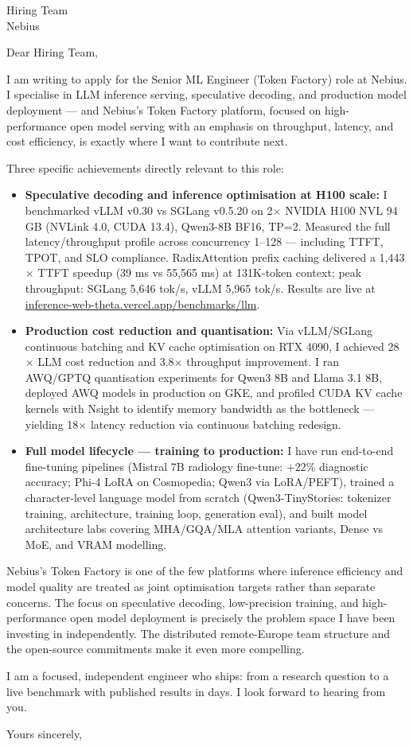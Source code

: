 \documentclass[a4paper]{letter}
\date{\today}
\begin{document}
\begin{letter}{Hiring Team \\ Nebius}

\opening{Dear Hiring Team,}

I am writing to apply for the Senior ML Engineer (Token Factory) role at Nebius. I specialise in LLM inference serving, speculative decoding, and production model deployment — and Nebius's Token Factory platform, focused on high-performance open model serving with an emphasis on throughput, latency, and cost efficiency, is exactly where I want to contribute next.

Three specific achievements directly relevant to this role:

\begin{itemize}
  \item \textbf{Speculative decoding and inference optimisation at H100 scale:} I benchmarked vLLM v0.30 vs SGLang v0.5.20 on 2$\times$ NVIDIA H100 NVL 94 GB (NVLink 4.0, CUDA 13.4), Qwen3-8B BF16, TP=2. Measured the full latency/throughput profile across concurrency 1--128 — including TTFT, TPOT, and SLO compliance. RadixAttention prefix caching delivered a 1,443$\times$ TTFT speedup (39 ms vs 55,565 ms) at 131K-token context; peak throughput: SGLang 5,646 tok/s, vLLM 5,965 tok/s. Results are live at \href{https://inference-web-theta.vercel.app/benchmarks/llm}{inference-web-theta.vercel.app/benchmarks/llm}.
  \item \textbf{Production cost reduction and quantisation:} Via vLLM/SGLang continuous batching and KV cache optimisation on RTX 4090, I achieved 28$\times$ LLM cost reduction and 3.8$\times$ throughput improvement. I ran AWQ/GPTQ quantisation experiments for Qwen3 8B and Llama 3.1 8B, deployed AWQ models in production on GKE, and profiled CUDA KV cache kernels with Nsight to identify memory bandwidth as the bottleneck — yielding 18$\times$ latency reduction via continuous batching redesign.
  \item \textbf{Full model lifecycle — training to production:} I have run end-to-end fine-tuning pipelines (Mistral 7B radiology fine-tune: $+22\%$ diagnostic accuracy; Phi-4 LoRA on Cosmopedia; Qwen3 via LoRA/PEFT), trained a character-level language model from scratch (Qwen3-TinyStories: tokenizer training, architecture, training loop, generation eval), and built model architecture labs covering MHA/GQA/MLA attention variants, Dense vs MoE, and VRAM modelling.
\end{itemize}

Nebius's Token Factory is one of the few platforms where inference efficiency and model quality are treated as joint optimisation targets rather than separate concerns. The focus on speculative decoding, low-precision training, and high-performance open model deployment is precisely the problem space I have been investing in independently. The distributed remote-Europe team structure and the open-source commitments make it even more compelling.

I am a focused, independent engineer who ships: from a research question to a live benchmark with published results in days. I look forward to hearing from you.

\closing{Yours sincerely,}

\end{letter}
\end{document}
